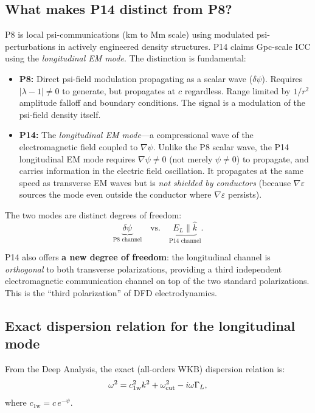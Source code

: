 \documentclass[11pt]{article}
\newcommand{\cfield}{c_{1\mathrm{w}}}
\begin{document}
\subsection{What makes P14 distinct from P8?}

P8 is local psi-communications (km to Mm scale) using modulated
psi-perturbations in actively engineered density structures.
P14 claims Gpc-scale ICC using the \textit{longitudinal EM mode}.
The distinction is fundamental:

\begin{itemize}
\item \textbf{P8:} Direct psi-field modulation propagating as a
scalar wave ($\delta\psi$). Requires $|\lambda-1| \neq 0$ to generate,
but propagates at $c$ regardless. Range limited by $1/r^2$ amplitude
falloff and boundary conditions. The signal is a modulation of the
psi-field density itself.

\item \textbf{P14:} The \textit{longitudinal EM mode}---a compressional
wave of the electromagnetic field coupled to $\nabla\psi$. Unlike the
P8 scalar wave, the P14 longitudinal EM mode requires $\nabla\psi \neq 0$
(not merely $\psi \neq 0$) to propagate, and carries information
in the electric field oscillation. It propagates at the same speed
as transverse EM waves but is \textit{not shielded by conductors}
(because $\nabla\varepsilon$ sources the mode even outside the
conductor where $\nabla\varepsilon$ persists).
\end{itemize}

The two modes are distinct degrees of freedom:
\begin{equation}
\underbrace{\delta\psi}_{\text{P8 channel}} \quad \text{vs.} \quad
\underbrace{E_L \parallel \hat{k}}_{\text{P14 channel}}.
\end{equation}

P14 also offers \textbf{a new degree of freedom}: the longitudinal
channel is \textit{orthogonal} to both transverse polarizations,
providing a third independent electromagnetic communication channel
on top of the two standard polarizations. This is the ``third
polarization'' of DFD electrodynamics.

\subsection{Exact dispersion relation for the longitudinal mode}

From the Deep Analysis, the exact (all-orders WKB) dispersion
relation is:
\begin{equation}
\omega^2 = \cfield^2 k^2 + \omega_{\rm cut}^2 - i\omega\Gamma_L,
\label{eq:disp-exact}
\end{equation}
where $\cfield = c\,e^{-\psi}$.
\end{document}

